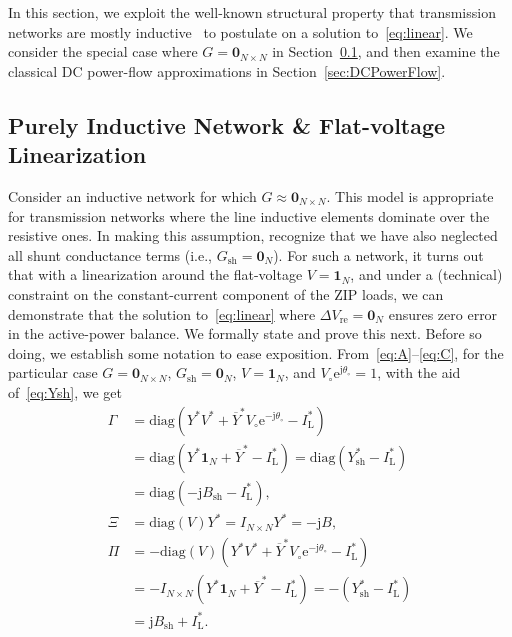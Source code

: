 \documentclass[10 pt, conference]{ieeeconf}
\begin{document}
In this section, we exploit the well-known structural property that transmission networks are mostly inductive~\cite{Wood:1996} to postulate on a solution to~\eqref{eq:linear}. We consider the special case where $G = \mathbf{0}_{N \times N}$ in Section~\ref{sec:inductive}, and then examine the classical DC power-flow approximations in Section~\ref{sec:DCPowerFlow}. 

\subsection{Purely Inductive Network \& Flat-voltage Linearization} \label{sec:inductive}
Consider an inductive network for which $G \approx \mathbf{0}_{N\times N}$.  This model is appropriate for transmission networks where the line inductive elements dominate over the resistive ones. In making this assumption, recognize that we have also neglected all shunt conductance terms (i.e., $G_\mathrm{sh} = \mathbf{0}_N$). For such a network, it turns out that with a linearization around the flat-voltage $V = \mathbf{1}_N$, and under a (technical) constraint on the constant-current component of the $\mathrm{ZIP}$ loads, we can demonstrate that the solution to~\eqref{eq:linear} where $\Delta V_\mathrm{re} = \mathbf{0}_{N}$ ensures zero error in the active-power balance. We formally state and prove this next. Before so doing, we establish some notation to ease exposition. From~\eqref{eq:A}--\eqref{eq:C}, for the particular case $G = \mathbf{0}_{N \times N}$, $G_\mathrm{sh} = \mathbf{0}_N$, $V = \mathbf{1}_N$, and $V_\circ \mathrm{e}^{\mathrm j \theta_\circ} = 1$, with the aid of~\eqref{eq:Ysh}, we get
\begin{align} 
\Gamma &= \mathrm{diag}\left(Y^* V^* + \overline{Y}^* V_\circ \mathrm e^{-\mathrm j \theta_\circ} - I_\mathrm{L}^* \right) \nonumber \\
&= \mathrm{diag}\left(Y^* \mathbf{1}_N + \overline{Y}^* - I_\mathrm{L}^*\right) = \mathrm{diag}(Y^*_\mathrm{sh} - I_\mathrm{L}^*) \nonumber \\
&= \mathrm{diag}(-\mathrm j B_\mathrm{sh} - I_\mathrm{L}^*), \nonumber \\
\Xi &= \mathrm{diag}\left(V\right) Y^* = I_{N\times N} Y^* = -\mathrm j B, \nonumber \\
\Pi &= -\mathrm{diag}\left(V\right) \left(Y^* V^*  + \overline{Y}^* V_\circ \mathrm e^{-\mathrm j \theta_\circ} - I_\mathrm{L}^*\right) \nonumber \\
&= -I_{N\times N}\left(Y^* \mathbf{1}_N + \overline{Y}^*- I_\mathrm{L}^*\right) = - \left( Y^*_\mathrm{sh}- I_\mathrm{L}^* \right) \nonumber \\
&= \mathrm j B_\mathrm{sh}  + I_\mathrm{L}^*.
\end{align}
\end{document}
